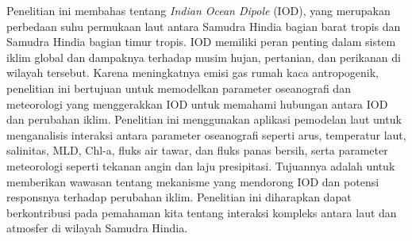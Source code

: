 \begin{spacing}{1.5}
	\pagestyle{empty}
	\begin{center}
		\vskip 1cm
		\justifying
		Penelitian ini membahas tentang \textit{Indian Ocean Dipole} (IOD), yang merupakan perbedaan suhu permukaan laut antara Samudra Hindia bagian barat tropis dan Samudra Hindia bagian timur tropis. IOD memiliki peran penting dalam sistem iklim global dan dampaknya terhadap musim hujan, pertanian, dan perikanan di wilayah tersebut. Karena meningkatnya emisi gas rumah kaca antropogenik, penelitian ini bertujuan untuk memodelkan parameter oseanografi dan meteorologi yang menggerakkan IOD untuk memahami hubungan antara IOD dan perubahan iklim. Penelitian ini menggunakan aplikasi pemodelan laut untuk menganalisis interaksi antara parameter oseanografi seperti arus, temperatur laut, salinitas, MLD, Chl-a, fluks air tawar, dan fluks panas bersih, serta parameter meteorologi seperti tekanan angin dan laju presipitasi. Tujuannya adalah untuk memberikan wawasan tentang mekanisme yang mendorong IOD dan potensi responsnya terhadap perubahan iklim. Penelitian ini diharapkan dapat berkontribusi pada pemahaman kita tentang interaksi kompleks antara laut dan atmosfer di wilayah Samudra Hindia.
	\end{center}
\end{spacing}
\pagestyle{empty}